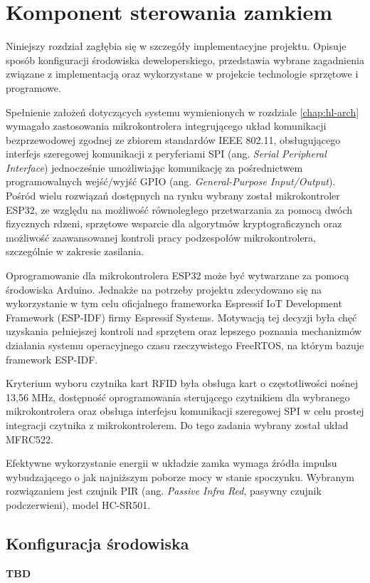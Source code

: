 \chapter{Komponent sterowania zamkiem}
\label{chap:controller}

    Niniejszy rozdział zagłębia się w szczegóły implementacyjne projektu. Opisuje sposób konfiguracji środowiska deweloperskiego, przedstawia wybrane zagadnienia związane z implementacją oraz wykorzystane w projekcie technologie sprzętowe i programowe.

        Spełnienie założeń dotyczących systemu wymienionych w rozdziale \ref{chap:hl-arch} wymagało zastosowania mikrokontrolera integrującego układ komunikacji bezprzewodowej zgodnej ze zbiorem standardów IEEE 802.11, obsługującego interfejs szeregowej komunikacji z peryferiami SPI (ang. \textit{Serial Peripheral Interface}) jednocześnie umożliwiając komunikację za pośrednictwem programowalnych wejść/wyjść GPIO (ang. \textit{General-Purpose Input/Output}). Pośród wielu rozwiązań dostępnych na rynku wybrany został mikrokontroler ESP32, ze względu na możliwość równoległego przetwarzania za pomocą dwóch fizycznych rdzeni, sprzętowe wsparcie dla algorytmów kryptograficzynch oraz możliwość zaawansowanej kontroli pracy podzespołów mikrokontrolera, szczególnie w zakresie zasilania.

        Oprogramowanie dla mikrokontrolera ESP32 może być wytwarzane za pomocą środowiska Arduino. Jednakże na potrzeby projektu zdecydowano się na wykorzystanie w tym celu oficjalnego frameworka Espressif IoT Development Framework (ESP-IDF) firmy Espressif Systems. Motywacją tej decyzji była chęć uzyskania pełniejszej kontroli nad sprzętem oraz lepszego poznania mechanizmów działania systemu operacyjnego czasu rzeczywistego FreeRTOS, na którym bazuje framework ESP-IDF.

        Kryterium wyboru czytnika kart RFID była obsługa kart o częstotliwości nośnej 13,56 MHz, dostępność oprogramowania sterującego czytnikiem dla wybranego mikrokontrolera oraz obsługa interfejsu komunikacji szeregowej SPI w celu prostej integracji czytnika z mikrokontrolerem. Do tego zadania wybrany został układ MFRC522.

        Efektywne wykorzystanie energii w układzie zamka wymaga źródła impulsu wybudzającego o jak najniższym poborze mocy w stanie spoczynku. Wybranym rozwiązaniem jest czujnik PIR (ang. \textit{Passive Infra Red}, pasywny czujnik podczerwieni), model HC-SR501.

        \section{Konfiguracja środowiska}
            \textbf{TBD}

